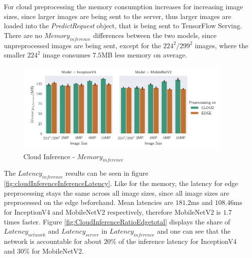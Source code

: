 For cloud preprocessing the memory consumption increases for increasing image sizes, since larger images are being sent to the server, thus larger images are loaded into the \emph{PredictRequest} object, that is being sent to TensorFlow Serving.
There are no $Memory_{inference}$  differences between the two models, since unpreprocessed images are being sent, except for the $224^2/299^2$ images, where the smaller $224^2$ image consumes $7.5$MB less memory on average.
\begin{figure}[H]
\centering
\includegraphics[width=0.95\textwidth]{./Bilder/single_plots/cloud_inference_plots/Cloud_Inference_Memory.pdf}
\caption{Cloud Inference -  $Memory_{inference}$}
\label{fig:cloudInferenceInferenceMemory}
\end{figure}
The $Latency_{inference}$ results can be seen in figure \ref{fig:cloudInferenceInferenceLatency}.
Like for the memory, the latency for edge preprocessing stays the same across all image sizes, since all image sizes are preprocessed on the edge beforehand. 
Mean latencies are $181.2$ms and $108.46$ms for InceptionV4 and MobileNetV2 respectively, therefore MobileNetV2 is $1.7$ times faster.
Figure \ref{fig:CloudInferenceRatioEdgetotal} displays the share of $Latency_{network}$ and $Latency_{server}$ in $Latency_{inference}$ and one can see that the network is accountable for about $20\%$ of the  inference latency for InceptionV4 and $30\%$ for MobileNetV2.

